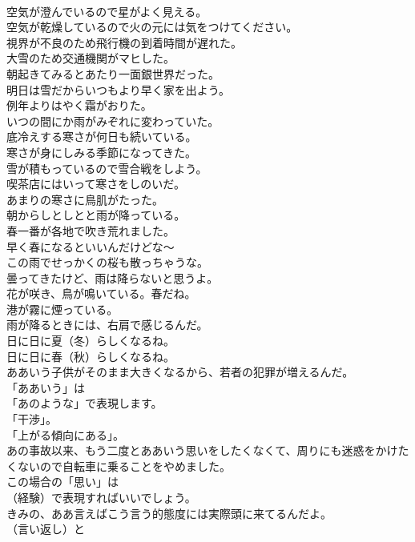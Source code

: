 \documentclass[8pt]{extreport}
\begin{document}
\begin{CJK}{UTF8}{min}
\\	空気が澄んでいるので星がよく見える。	
\\	空気が乾燥しているので火の元には気をつけてください。	
\\	視界が不良のため飛行機の到着時間が遅れた。	
\\	大雪のため交通機関がマヒした。	
\\	朝起きてみるとあたり一面銀世界だった。	
\\	明日は雪だからいつもより早く家を出よう。	
\\	例年よりはやく霜がおりた。	
\\	いつの間にか雨がみぞれに変わっていた。	
\\	底冷えする寒さが何日も続いている。	
\\	寒さが身にしみる季節になってきた。	
\\	雪が積もっているので雪合戦をしよう。	
\\	喫茶店にはいって寒さをしのいだ。	
\\	あまりの寒さに鳥肌がたった。	
\\	朝からしとしとと雨が降っている。	
\\	春一番が各地で吹き荒れました。	
\\	早く春になるといいんだけどな～	
\\	この雨でせっかくの桜も散っちゃうな。	
\\	曇ってきたけど、雨は降らないと思うよ。	
\\	花が咲き、鳥が鳴いている。春だね。	
\\	港が霧に煙っている。	
\\	雨が降るときには、右肩で感じるんだ。	
\\	日に日に夏（冬）らしくなるね。	
\\	日に日に春（秋）らしくなるね。	
\\	ああいう子供がそのまま大きくなるから、若者の犯罪が増えるんだ。 
\\	「ああいう」は
\\	「あのような」で表現します。
\\	「干渉」。
\\	「上がる傾向にある」。	
\\	あの事故以来、もう二度とああいう思いをしたくなくて、周りにも迷惑をかけたくないので自転車に乗ることをやめました。 
\\	この場合の「思い」は 
\\	（経験）で表現すればいいでしょう。	
\\	きみの、ああ言えばこう言う的態度には実際頭に来てるんだよ。 
\\	（言い返し）と 

\end{CJK}
\end{document}
